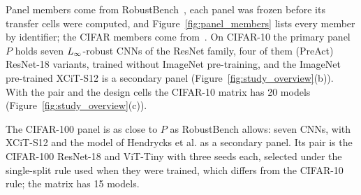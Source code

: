 Panel members come from RobustBench~\cite{croce2021robustbench}, each panel was frozen before its transfer cells were computed, and Figure~\ref{fig:panel_members} lists every member by identifier; the CIFAR members come from~\cite{wong2020fast, engstrom2019robustness, carmon2019unlabeled, gowal2020uncovering, sehwag2022robust, addepalli2022efficient, rade2022reducing, rice2020overfitting, pang2022robustness, wang2023better, jia2022lasat, debenedetti2023light, hendrycks2019using}. On CIFAR-10 the primary panel $P$ holds seven $L_\infty$-robust CNNs of the ResNet family, four of them (PreAct) ResNet-18 variants, trained without ImageNet pre-training, and the ImageNet pre-trained XCiT-S12 is a secondary panel (Figure~\ref{fig:study_overview}(b)). With the pair and the design cells the CIFAR-10 matrix has 20 models (Figure~\ref{fig:study_overview}(c)).

The CIFAR-100 panel is as close to $P$ as RobustBench allows: seven CNNs, with XCiT-S12 and the model of Hendrycks et al. as a secondary panel. Its pair is the CIFAR-100 ResNet-18 and ViT-Tiny with three seeds each, selected under the single-split rule used when they were trained, which differs from the CIFAR-10 rule; the matrix has 15 models.

